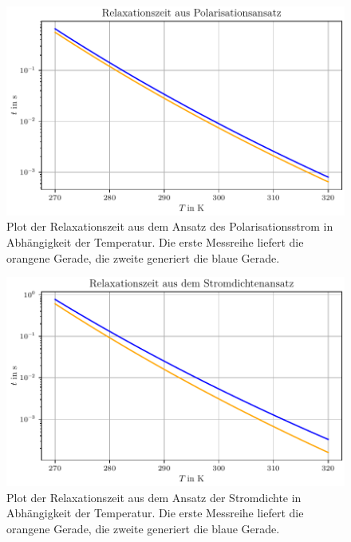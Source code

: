 \begin{figure}[H]
    \centering
    \includegraphics[width=\textwidth]{plots/I_relaxationszeit_polarisation.pdf}
    \caption{Plot der Relaxationszeit aus dem Ansatz des Polarisationsstrom in Abhängigkeit der Temperatur.
    Die erste Messreihe liefert die orangene Gerade, die zweite generiert die blaue Gerade.}
    \label{fig:Relaxationszeit_p}
\end{figure}

\begin{figure}[H]
    \centering
    \includegraphics[width=\textwidth]{plots/J_relaxationszeit_stromdichte.pdf}
    \caption{Plot der Relaxationszeit aus dem Ansatz der Stromdichte in Abhängigkeit der Temperatur.
    Die erste Messreihe liefert die orangene Gerade, die zweite generiert die blaue Gerade.}
    \label{fig:Relaxationszeit_j}
\end{figure}